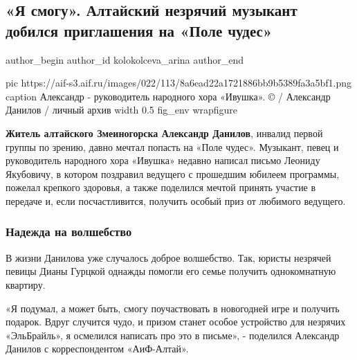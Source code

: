  
 
 
 
 
 
\subsection{«Я смогу». Алтайский незрячий музыкант добился приглашения на «Поле чудес»}
\label{sec:04_12_2020.news.ru.aif.kolokolceva_arina.1.pole_chudes_nezrjachii}
\ifcmt
	author_begin
   author_id kolokolceva_arina
	author_end
\fi

\ifcmt
  pic https://aif-s3.aif.ru/images/022/113/8a6ead22a1721886bb9b5389fa3a5bf1.png
  caption  Александр - руководитель народного хора «Ивушка». © / Александр Данилов / личный архив 
  width 0.5
  fig_env wrapfigure
\fi


\textbf{Житель алтайского Змеиногорска Александр Данилов}, инвалид первой группы по
зрению, давно мечтал попасть на «Поле чудес». Музыкант, певец и руководитель
народного хора «Ивушка» недавно написал письмо Леониду Якубовичу, в котором
поздравил ведущего с прошедшим юбилеем программы, пожелал крепкого здоровья, а
также поделился мечтой принять участие в передаче и, если посчастливится,
получить особый приз от любимого ведущего.

\subsubsection{Надежда на волшебство}

В жизни Данилова уже случалось доброе волшебство. Так, юристы незрячей певицы
Дианы Гурцкой однажды помогли его семье получить однокомнатную квартиру.

«Я подумал, а может быть, смогу поучаствовать в новогодней игре и получить
подарок. Вдруг случится чудо, и призом станет особое устройство для незрячих
«ЭльБрайль», я осмелился написать про это в письме», - поделился  Александр
Данилов с корреспондентом «АиФ-Алтай».

